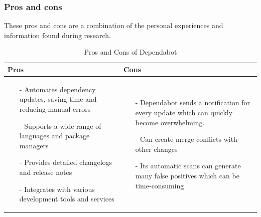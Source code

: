 \subsubsection{Pros and cons}
These pros and cons are a combination of the personal experiences and information found during research. \cite{prosconsdependabot} 

\begin{table}[H]
\centering
\begin{tabular}{|>{\raggedright\arraybackslash}p{6cm}|>{\raggedright\arraybackslash}p{6cm}|}
\hline
\textbf{Pros} & \textbf{Cons} \\
\hline
\begin{itemize}
\item [-]Automates dependency updates, saving time and reducing manual errors 
\item [-] Supports a wide range of languages and package managers 
\item [-] Provides detailed changelogs and release notes 
\item [-] Integrates with various development tools and services
\end{itemize}
&
\begin{itemize}
\item [-] Dependabot sends a notification for every update which can quickly 
  become overwhelming. 
\item [-] Can create merge conflicts with other changes 
\item [-] Its automatic scans can generate many false positives which can be time-consuming
\end{itemize}
\\
\hline
\end{tabular}
\caption{Pros and Cons of Dependabot}
\label{tab:dependabot}
\end{table}

